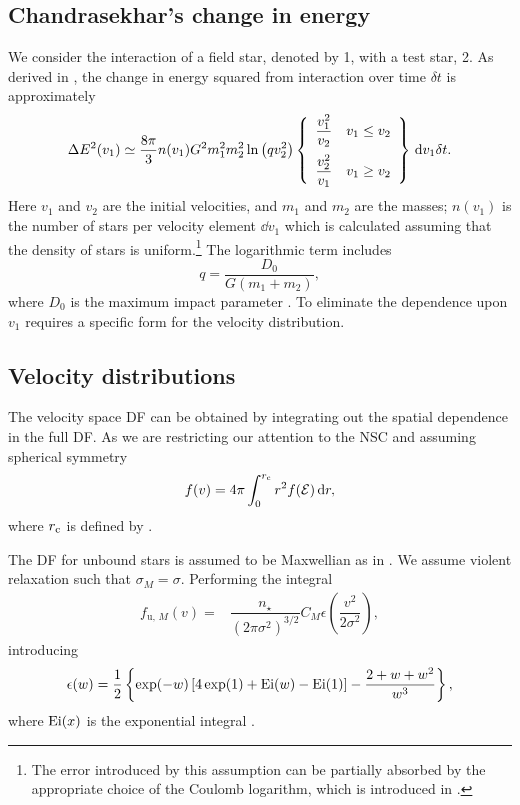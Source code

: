 \subsection{Chandrasekhar's change in energy}

We consider the interaction of a field star, denoted by 1, with a test star, 2. As derived in , the change in energy squared from interaction over time $\delta t$ is approximately \citep[chapter 2]{Chandrasekhar1960}
\begin{equation}
\Delta E^2(v_1) \simeq \dfrac{8\pi}{3} n(v_1)G^2m_1^2 m_2^2\ln\left(qv_2^2\right)\left\{\begin{array}{lr}\dfrac{v_1^2}{v_2}\vspace{2mm} & v_1 \leq v_2\\ \dfrac{v_2^2}{v_1} & v_1 \geq v_2 \end{array}\right\}\,\dd v_1\delta t.
\end{equation}
Here $v_1$ and $v_2$ are the initial velocities, and $m_1$ and $m_2$ are the masses; $n(v_1)$ is the number of stars per velocity element $\dd v_1$ which is calculated assuming that the density of stars is uniform.\footnote{The error introduced by this assumption can be partially absorbed by the appropriate choice of the Coulomb logarithm, which is introduced in  \citep{Just2011}.} The logarithmic term includes
\begin{equation}
q = \dfrac{D_0}{G\left(m_1+m_2\right)},
\end{equation}
where $D_0$ is the maximum impact parameter \citep{Weinberg1986}. To eliminate the dependence upon $v_1$ requires a specific form for the velocity distribution.

\subsection{Velocity distributions}

The velocity space DF can be obtained by integrating out the spatial dependence in the full DF. As we are restricting our attention to the NSC and assuming spherical symmetry
\begin{equation}
f(v) = 4\pi\int_{0}^{r_\mathrm{c}}{r^2f(\mathcal{E})}\,\mathrm{d}{r},
\end{equation}
where $r_\mathrm{c}$ is defined by .

The DF for unbound stars is assumed to be Maxwellian as in . We assume violent relaxation such that $\sigma_M = \sigma$. Performing the integral
\begin{align}
f_{\mathrm{u},\,M}(v) = {} & \dfrac{n_\star}{\left(2\pi\sigma^2\right)^{3/2}}C_M\epsilon\left(\dfrac{v^2}{2\sigma^2}\right),
\end{align}
introducing
\begin{equation}
\epsilon(w) = \dfrac{1}{2}\left\{\exp(-w)\left[4\exp(1) + \operatorname{Ei}(w) - \operatorname{Ei}(1)\right] - \dfrac{2 + w + w^2}{w^3}\right\},
\end{equation}
where $\operatorname{Ei}(x)$ is the exponential integral \citep[6.2.4]{Olver2010}.

